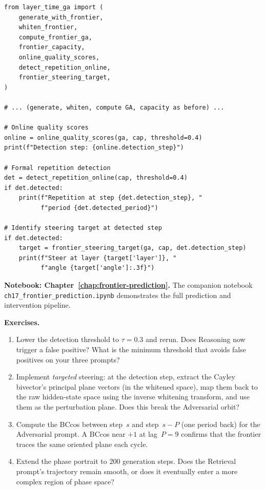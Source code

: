 \documentclass[11pt, twoside, openright]{memoir}
\numberwithin{equation}{chapter}
\begin{document}
\begin{lstlisting}[caption={Online monitoring and detection pipeline}]
from layer_time_ga import (
    generate_with_frontier,
    whiten_frontier,
    compute_frontier_ga,
    frontier_capacity,
    online_quality_scores,
    detect_repetition_online,
    frontier_steering_target,
)

# ... (generate, whiten, compute GA, capacity as before) ...

# Online quality scores
online = online_quality_scores(ga, cap, threshold=0.4)
print(f"Detection step: {online.detection_step}")

# Formal repetition detection
det = detect_repetition_online(cap, threshold=0.4)
if det.detected:
    print(f"Repetition at step {det.detection_step}, "
          f"period {det.detected_period}")

# Identify steering target at detected step
if det.detected:
    target = frontier_steering_target(ga, cap, det.detection_step)
    print(f"Steer at layer {target['layer']}, "
          f"angle {target['angle']:.3f}")
\end{lstlisting}

\begin{tryit}
\textbf{Notebook: Chapter~\ref{chap:frontier-prediction}.}
The companion notebook
\texttt{ch17\_frontier\_prediction.ipynb} demonstrates the full
prediction and intervention pipeline.

\medskip
\textbf{Exercises.}

\begin{enumerate}[nosep]
\item Lower the detection threshold to $\tau = 0.3$ and rerun.
  Does Reasoning now trigger a false positive?  What is the
  minimum threshold that avoids false positives on your three
  prompts?

\item Implement \emph{targeted} steering: at the detection step,
  extract the Cayley bivector's principal plane vectors (in the
  whitened space), map them back to the raw hidden-state space
  using the inverse whitening transform, and use them as the
  perturbation plane.  Does this break the Adversarial orbit?

\item Compute the BCcos between step~$s$ and step~$s - P$
  (one period back) for the Adversarial prompt.  A BCcos near
  $+1$ at lag~$P = 9$ confirms that the frontier traces the same
  oriented plane each cycle.

\item Extend the phase portrait to 200 generation steps.
  Does the Retrieval prompt's trajectory remain smooth, or does
  it eventually enter a more complex region of phase space?
\end{enumerate}
\end{tryit}
\end{document}
